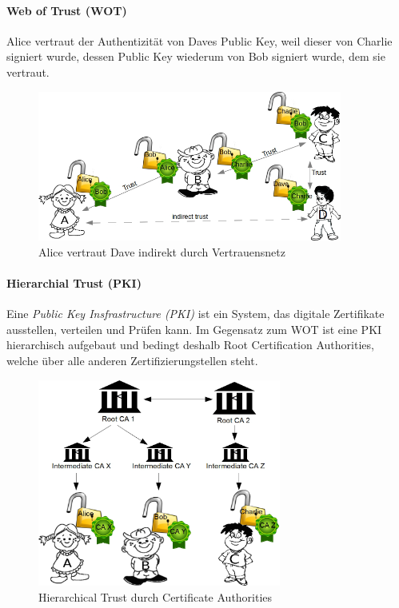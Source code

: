 \documentclass[10pt,a4paper]{article}
\begin{document}
\paragraph*{Web of Trust (WOT)}
Alice vertraut der Authentizität von Daves Public Key, weil dieser von Charlie signiert wurde, dessen Public Key wiederum von Bob signiert wurde, dem sie vertraut.
\begin{figure}[H]
    \begin{center}
    \includegraphics[width=10cm]{images/wot.png}
    \caption{Alice vertraut Dave indirekt durch Vertrauensnetz}
    \label{wot}
    \end{center}
\end{figure}

\paragraph*{Hierarchial Trust (PKI)}Eine \textsl{Public Key Insfrastructure (PKI)} ist ein System, das digitale Zertifikate ausstellen, verteilen und Prüfen kann. Im Gegensatz zum WOT ist eine PKI hierarchisch aufgebaut und bedingt deshalb Root Certification Authorities, welche über alle anderen Zertifizierungstellen steht.
\begin{figure}[H]
    \begin{center}
    \includegraphics[width=8cm]{images/ht.png}
    \caption{Hierarchical Trust durch Certificate Authorities}
    \label{ht}
    \end{center}
\end{figure}
\end{document}
